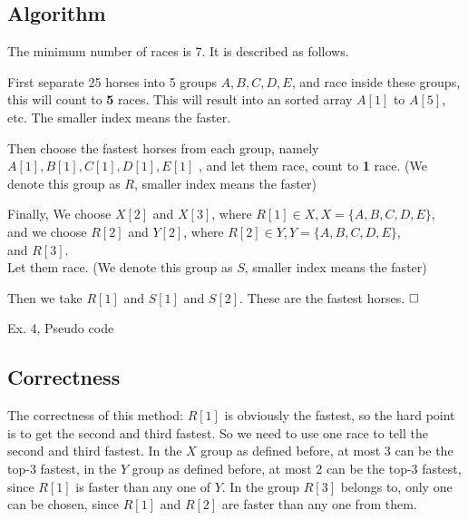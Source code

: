 \documentclass{article}
\newcommand{\qedhere}{$\hfill\ensuremath{\square}$}
\begin{document}
\subsection{Algorithm}
\par The minimum number of races is 7. It is described as follows.
\par First separate 25 horses into 5 groups $A, B, C, D, E$, and race inside these groups, this will count to \textbf{5} races. This will result into an sorted array $A[1]$ to $A[5]$, etc. The smaller index means the faster.
\par Then choose the fastest horses from each group, namely $A[1], B[1], C[1], D[1], E[1]$ , and let them race, count to \textbf{1} race. (We denote this group as $R$, smaller index means the faster)
\par Finally, We choose \underline{$X[2]$} and \underline{$X[3]$}, where $R[1] \in X, X=\{A, B, C, D, E\}$, \\ and we choose \underline{$R[2]$} and \underline{$Y[2]$}, where $R[2] \in Y, Y=\{A, B, C, D, E\}$, \\and \underline{$R[3]$}. \\Let them race. (We denote this group as $S$, smaller index means the faster)
\par Then we take $R[1]$ and $S[1]$ and $S[2]$. These are the fastest horses.
\qedhere 
\par 
\vspace*{1em}
\begin{algorithm}[H]
\BlankLine
{}
\caption{Ex. 4, Pseudo code}
\end{algorithm}

\subsection{Correctness}
The correctness of this method: $R[1]$ is obviously the fastest, so the hard point is to get the second and third fastest. So we need to use one race to tell the second and third fastest. In the $X$ group as defined before, at most 3 can be the top-3 fastest, in the $Y$ group as defined before, at most 2 can be the top-3 fastest, since $R[1]$ is faster than any one of $Y$. In the group $R[3]$ belongs to, only one can be chosen, since $R[1]$ and $R[2]$ are faster than any one from them. 
\end{document}
